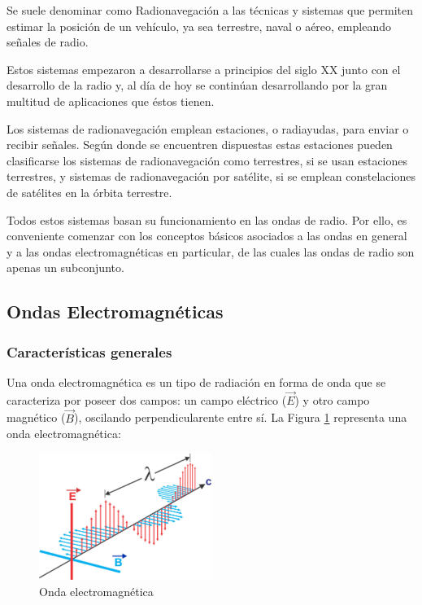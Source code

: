 Se suele denominar como Radionavegaci\'on a las t\'ecnicas y sistemas que permiten estimar la posici\'on de un veh\'iculo, ya sea terrestre, naval o a\'ereo, empleando se\~nales de radio.

Estos sistemas empezaron a desarrollarse a principios del siglo XX junto con el desarrollo de la radio y, al día de hoy se contin\'uan desarrollando por la gran multitud de aplicaciones que éstos tienen.

Los sistemas de radionavegación emplean estaciones, o radiayudas, para enviar o recibir señales. Seg\'un  donde se encuentren dispuestas estas estaciones pueden clasificarse los sistemas de radionavegación como terrestres, si se usan estaciones terrestres, y sistemas de radionavegación por satélite, si se emplean constelaciones de satélites en la \'orbita terrestre.

Todos estos sistemas basan su funcionamiento en las ondas de radio.
 Por ello, es conveniente comenzar con los conceptos b\'asicos asociados a las ondas en general y a las ondas electromagn\'eticas en particular, de las cuales las ondas de radio son apenas un subconjunto.

\subsection{ Ondas Electromagn\'eticas }
\label{sec:06.ondas.electromagneticas}


\subsubsection{Caracter\'isticas generales}
\label{sec:06.ondas.electromagneticas.caracteristicas.generales}

Una onda electromagn\'etica es un tipo de radiaci\'on en forma de onda que se caracteriza por poseer dos campos: un campo el\'ectrico ($\vec{E}$) y otro campo magn\'etico ($\vec{B}$), oscilando perpendicularente entre s\'i. La Figura \ref{fig:onda-electromagnetica} representa una onda electromagn\'etica: 

\begin{figure}[!h]
  \centering
  \includegraphics[width=0.5\textwidth]{06.radionavegacion/Imagenes/06.00.ondas.electromagneticas/onda_electromagnetica.jpg}  
  \caption{Onda electromagn\'etica \protect\cite{onda_electro_magnetica}}
  \label{fig:onda-electromagnetica}
\end{figure}



